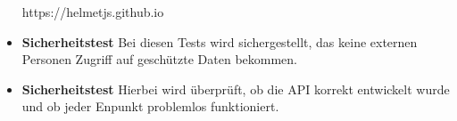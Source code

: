 \begin{itemize}
        \cite{Helmet}
        https://helmetjs.github.io
    \item \textbf{Sicherheitstest}
        \newline
        Bei diesen Tests wird sichergestellt, das keine externen Personen Zugriff auf geschützte Daten bekommen.
    \item \textbf{Sicherheitstest}
        \newline
        Hierbei wird überprüft, ob die API korrekt entwickelt wurde und ob jeder Enpunkt problemlos funktioniert.
\end{itemize}